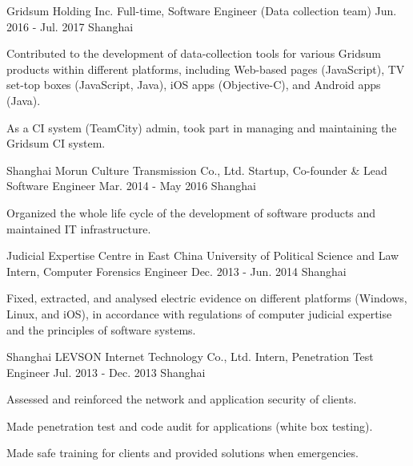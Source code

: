 \begin{cventries}
  \cventry
    {Gridsum Holding Inc.}
    {Full-time, Software Engineer (Data collection team)}
    {Jun. 2016 - Jul. 2017}
    {Shanghai}
    {
      \begin{cvitems}
        \item {Contributed to the development of data-collection tools for various Gridsum products within different platforms, including Web-based pages (JavaScript), TV set-top boxes (JavaScript, Java), iOS apps (Objective-C), and Android apps (Java).}
        \item {As a CI system (TeamCity) admin, took part in managing and maintaining the Gridsum CI system.}
      \end{cvitems}
    }
    
  \cventry
    {Shanghai Morun Culture Transmission Co., Ltd.}
    {Startup, Co-founder \& Lead Software Engineer}
    {Mar. 2014 - May 2016}
    {Shanghai}
    {
      \begin{cvitems}
        \item {Organized the whole life cycle of the development of software products and maintained IT infrastructure.}
      \end{cvitems}
    }
    
  \cventry
    {Judicial Expertise Centre in East China University of Political Science and Law}
    {Intern, Computer Forensics Engineer}
    {Dec. 2013 - Jun. 2014}
    {Shanghai}
    {
      \begin{cvitems}
        \item {Fixed, extracted, and analysed electric evidence on different platforms (Windows, Linux, and iOS), in accordance with regulations of computer judicial expertise and the principles of software systems.}
      \end{cvitems} 
    }
    
  \cventry
    {Shanghai LEVSON Internet Technology Co., Ltd.}
    {Intern, Penetration Test Engineer}
    {Jul. 2013 - Dec. 2013}
    {Shanghai}
    {
      \begin{cvitems}
        \item {Assessed and reinforced the network and application security of clients.}
        \item {Made penetration test and code audit for applications (white box testing).}
        \item {Made safe training for clients and provided solutions when emergencies.}
      \end{cvitems}
    }

\end{cventries}
